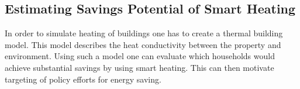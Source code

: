 \subsection{Estimating Savings Potential of Smart Heating}
In order to simulate heating of buildings one has to create a thermal building model.
This model describes the heat conductivity between the property and environment.
Using such a model one can evaluate which households would achieve substantial savings by using smart heating.
This can then motivate targeting of policy efforts for energy saving.



